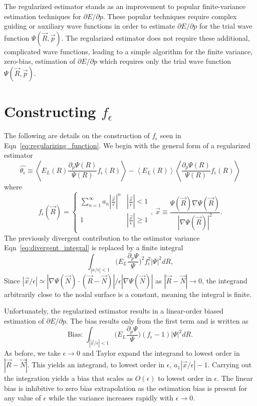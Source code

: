 \documentclass[twocolumn]{revtex4-1}
\begin{document}
The regularized estimator stands as an improvement to popular finite-variance estimation techniques for $\partial E/\partial p$.
These popular techniques require complex guiding \cite{Avella, Attaccalite2008, Zen2013}  or auxiliary wave functions \cite{Assaraf1999, doi:10.1063/1.1286598, Assaraf2003} in order to estimate $\partial E/\partial p$ for the trial wave function $\Psi(\vec{R}, \vec{p})$.
The regularized estimator does not require these additional, complicated wave functions, leading  to a simple algorithm for the finite variance, zero-bias, estimation of $\partial E/\partial p$ which requires only the trial wave function $\Psi(\vec{R}, \vec{p})$.

%


\appendix*
\section{Constructing $f_\epsilon$}
The following are details on the construction of $f_\epsilon$ seen in Eqn~\ref{eq:regularizing_function}. 
We begin with the general form of a regularized estimator
$$
\hat{\theta_\epsilon} \equiv
\left\langle E_L(R) \frac{\partial_p \Psi(R)}{\Psi(R)} f_\epsilon(R) \right\rangle - \left\langle E_L(R) \right \rangle \left \langle \frac{\partial_p \Psi(R)}{\Psi(R)} f_\epsilon(R) \right\rangle
$$
where 
\begin{equation}
f_\epsilon(\vec{R}) = \begin{cases} 
      \sum_{n=1}^{\infty} a_n |\frac{\vec{x}}{\epsilon}|^n & |\frac{\vec{x}}{\epsilon}| < 1 \\
      1 & |\frac{\vec{x}}{\epsilon}| \ge 1 \\
   \end{cases},\ \vec{x} \equiv \frac{\Psi(\vec{R})\nabla \Psi(\vec{R})}{|\nabla \Psi(\vec{R})|^2}.
\end{equation} 
The previously divergent contribution to the estimator variance Eqn~\ref{eq:divergent_integral} is replaced by a finite integral
$$ \int_{|x/\epsilon|< 1} \Big(E_L\frac{\partial_p\Psi}{\Psi}\Big)^2 f_\epsilon^2 |\Psi|^2 dR,
$$
Since $|\vec{x}/\epsilon| \simeq |\nabla\Psi(\vec{N}) \cdot (\vec{R}-\vec{N})|/\epsilon|\nabla  \Psi(\vec{N})|$ as $|\vec{R} - \vec{N}| \rightarrow 0$, the integrand arbitrarily close to the nodal surface is a constant, meaning the integral is finite.

Unfortunately, the regularized estimator results in a linear-order biased estimation of $\partial E/\partial p$.
The bias results only from the first term and is written as 
$$
\text{Bias: } \int_{|\vec{x}/\epsilon|< 1} \Big(E_L\frac{\partial_p\Psi}{\Psi}\Big) (f_\epsilon - 1)|\Psi|^2 dR.
$$
As before, we take $\epsilon \rightarrow 0$ and Taylor expand the integrand to lowest order in $|\vec{R}-\vec{N}|$.
This yields an integrand, to lowest order in $\epsilon$, $a_1|\vec{x}/\epsilon| - 1$.
Carrying out the integration yields a bias that scales as $O(\epsilon)$ to lowest order in $\epsilon$.
The linear bias is inhibitive to zero bias extrapolation as the estimation bias is present for any value of $\epsilon$ while the variance increases rapidly with $\epsilon \rightarrow 0$.
\end{document}
